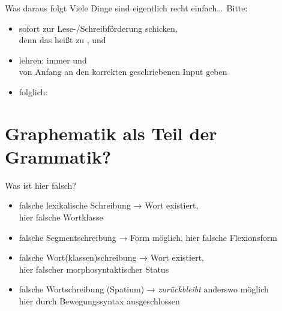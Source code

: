 \begin{frame}
  {Was daraus folgt}
  \pause
  Viele Dinge sind eigentlich recht einfach\ldots\ Bitte:\\
  \Zeile
  \pause
  \begin{itemize}[<+->]
    \item {} sofort zur Lese-\slash Schreibförderung schicken,\\
      denn das heißt zu ,  und 
    \item {}  lehren: \alert{immer und}\\
      \alert{von Anfang an den korrekten geschriebenen Input geben}
    \item folglich:   
  \end{itemize}
\end{frame}



\section{Graphematik als Teil der Grammatik?}

\begin{frame}
  {Was ist hier falsch?}
  \pause
  \begin{exe}
    \ex\label{ex:graphematikalsteildergrammatik001}
    \begin{xlist}
      \pause
      \pause
      \pause
    \end{xlist}
  \end{exe}
  \pause
  \begin{itemize}[<+->]
    \item falsche lexikalische Schreibung → Wort existiert,\\
      \alert{hier falsche Wortklasse}
    \item falsche Segmentschreibung → Form möglich, \alert{hier falsche Flexionsform}
    \item falsche Wort(klassen)schreibung → Wort existiert,\\
      \alert{hier falscher morphosyntaktischer Status}
    \item falsche Wortschreibung (Spatium) → \textit{zurückbleibt} anderswo möglich\\
      \alert{hier durch Bewegungssyntax ausgeschlossen}
  \end{itemize}
\end{frame}

